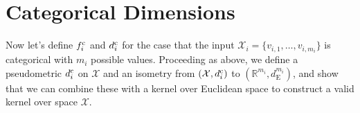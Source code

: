 \documentclass{article}
\newcommand{\vect}[1]{\underline{\smash{#1}}}
\renewcommand{\v}[1]{\vect{#1}}
\newcommand{\reals}{\mathds{R}}
\newcommand{\sX}{\mathcal{X}}
\newcommand{\br}{^{\text{\textnormal{ r}}}}
\newcommand{\cat}{^{\text{\textnormal{c}}}}
\begin{document}
% 
% 
% 
% 







\section{Categorical Dimensions}

Now let's define $f\cat_i$ and $d\cat_i$ for the case that the input $\sX_i=\{v_{i,1}, \dots, v_{i,m_i}\}$ is categorical with $m_i$ possible values. 
Proceeding as above, we define a pseudometric $d\cat_i$ on $\sX$ and an isometry from $(\sX, d\cat_i)$ to $(\reals^{m_i},d_{\text{E}}^{m_i})$, and show that we can combine these
with a kernel over Euclidean space to construct a valid kernel over space $\sX$. 
\end{document}
